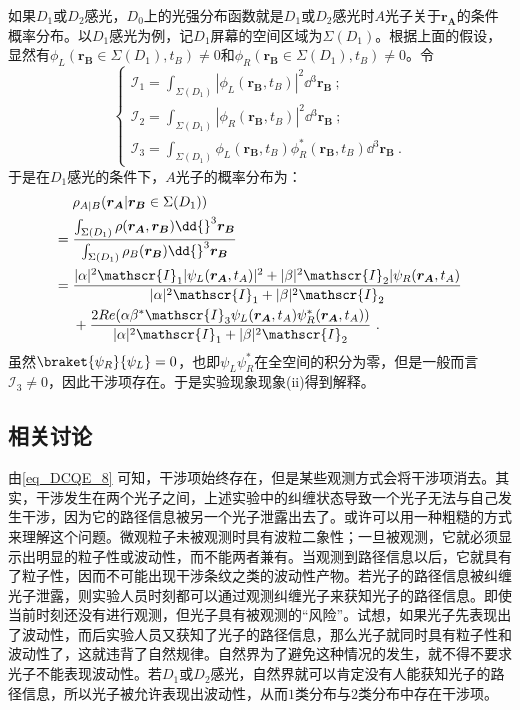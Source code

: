 如果$D_1$或$D_2$感光，$D_0$上的光强分布函数就是$D_1$或$D_2$感光时$A$光子关于$\boldsymbol{r_A}$的条件概率分布。以$D_1$感光为例，记$D_1$屏幕的空间区域为$\Sigma(D_1)$。根据上面的假设，显然有$\phi_L(\boldsymbol{r_B}\in\Sigma(D_1),t_B)\neq 0$和$\phi_R(\boldsymbol{r_B}\in\Sigma(D_1),t_B)\neq 0$。令
\begin{equation}
	\begin{cases}
	\mathscr{I}_1=\int_{\Sigma(D_1)}|\phi_L(\boldsymbol{r_B},t_B)|^2\dd{}^3\boldsymbol{r_B}~; \\
	\mathscr{I}_2=\int_{\Sigma(D_1)}|\phi_R(\boldsymbol{r_B},t_B)|^2\dd{}^3\boldsymbol{r_B}~; \\
	\mathscr{I}_3=\int_{\Sigma(D_1)}\phi_L(\boldsymbol{r_B},t_B)\phi_R^*(\boldsymbol{r_B},t_B)\dd{}^3\boldsymbol{r_B}~.
	\end{cases}
\end{equation}
于是在$D_1$感光的条件下，$A$光子的概率分布为：
\begin{align}
&\rho_{A|B}(\boldsymbol{r_A}|\boldsymbol{r_B}\in\Sigma(D_1)) \notag \\
={}&\frac{\int_{\Sigma(D_1)}\rho(\boldsymbol{r_A},\boldsymbol{r_B})\dd{}^3\boldsymbol{r_B}}{\int_{\Sigma(D_1)}\rho_B(\boldsymbol{r_B})\dd{}^3\boldsymbol{r_B}} \notag \\
={}&\frac{|\alpha|^2\mathscr{I}_1|\psi_L(\boldsymbol{r_A},t_A)|^2+|\beta|^2\mathscr{I}_2|\psi_R(\boldsymbol{r_A},t_A)}{|\alpha|^2\mathscr{I}_1+|\beta|^2\mathscr{I}_2} \notag \\
&+\frac{2Re(\alpha\beta^*\mathscr{I}_3\psi_L(\boldsymbol{r_A},t_A)\psi_R^*(\boldsymbol{r_A},t_A))}{|\alpha|^2\mathscr{I}_1+|\beta|^2\mathscr{I}_2}~.
\end{align}
虽然$\braket{\psi_R}{\psi_L}=0$，也即$\psi_L\psi_R^*$在全空间的积分为零，但是一般而言$\mathscr{I}_3\neq 0$，因此干涉项存在。于是实验现象现象(ii)得到解释。

\subsection{相关讨论}
由\autoref{eq_DCQE_8} 可知，干涉项始终存在，但是某些观测方式会将干涉项消去。其实，干涉发生在两个光子之间，上述实验中的纠缠状态导致一个光子无法与自己发生干涉，因为它的路径信息被另一个光子泄露出去了。或许可以用一种粗糙的方式来理解这个问题。微观粒子未被观测时具有波粒二象性；一旦被观测，它就必须显示出明显的粒子性或波动性，而不能两者兼有。当观测到路径信息以后，它就具有了粒子性，因而不可能出现干涉条纹之类的波动性产物。若光子的路径信息被纠缠光子泄露，则实验人员时刻都可以通过观测纠缠光子来获知光子的路径信息。即使当前时刻还没有进行观测，但光子具有被观测的“风险”。试想，如果光子先表现出了波动性，而后实验人员又获知了光子的路径信息，那么光子就同时具有粒子性和波动性了，这就违背了自然规律。自然界为了避免这种情况的发生，就不得不要求光子不能表现波动性。若$D_1$或$D_2$感光，自然界就可以肯定没有人能获知光子的路径信息，所以光子被允许表现出波动性，从而$1$类分布与$2$类分布中存在干涉项。

